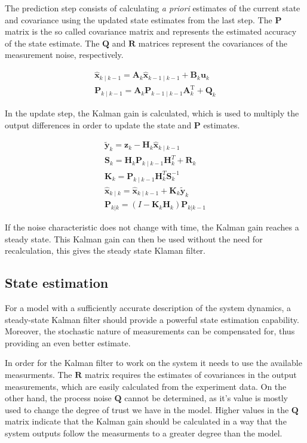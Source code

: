 {The prediction step consists of calculating \textit{a priori} estimates of the current state and covariance using the updated state estimates from the last step. 
The $\mathbf{P}$ matrix is the so called covariance matrix and represents the estimated accuracy of the state estimate.
The $\mathbf{Q}$ and $\mathbf{R}$ matrices represent the covariances of the measurement noise, respectively.

\begin{gather}
\hat{\mathbf{x}}_{k\mid k-1} = \mathbf{A}_{k}\hat{\mathbf{x}}_{k-1\mid k-1} + \mathbf{B}_{k} \mathbf{u}_{k} \\
\mathbf{P}_{k\mid k-1} =  \mathbf{A}_{k} \mathbf{P}_{k-1\mid k-1} \mathbf{A}_{k}^{\text{T}} + \mathbf{Q}_{k} 
\end{gather}

In the update step, the Kalman gain is calculated, which is used to multiply the output differences in order to update the state and $\mathbf{P}$  estimates.

\begin{gather}
\tilde{\mathbf{y}}_k = \mathbf{z}_k - \mathbf{H}_k\hat{\mathbf{x}}_{k\mid k-1}\\
\mathbf{S}_k = \mathbf{H}_k \mathbf{P}_{k\mid k-1} \mathbf{H}_k^T + \mathbf{R}_k\\
\mathbf{K}_k = \mathbf{P}_{k\mid k-1}\mathbf{H}_k^T \mathbf{S}_k^{-1}\\
\hat{\mathbf{x}}_{k\mid k} = \hat{\mathbf{x}}_{k\mid k-1} + \mathbf{K}_k\tilde{\mathbf{y}}_k \\
\mathbf{P}_{k|k} = (I - \mathbf{K}_k \mathbf{H}_k) \mathbf{P}_{k|k-1} 
\end{gather}

If the noise characteristic does not change with time, the Kalman gain reaches a steady state.
This Kalman gain can then be used without the need for recalculation, this gives the steady state Klaman filter.

\subsection{State estimation}
For a model with a sufficiently accurate  description of the system dynamics, a steady-state Kalman filter should provide a powerful state estimation capability.
Moreover, the stochastic nature of measurements can be compensated for, thus providing an even better estimate.

In order for the Kalman filter to work on the system it needs to use the available measurments.
The $\mathbf{R}$ matrix requires the estimates of covariances in the output measurements, which are easily calculated from the experiment data.
On the other hand, the process noise $\mathbf{Q}$ cannot be determined, as it's value is mostly used to change the degree of trust we have in the model. 
Higher values in the $\mathbf{Q}$ matrix indicate that the Kalman gain should be calculated in a way that the system outputs follow the measurments to a greater degree than the model.

}
